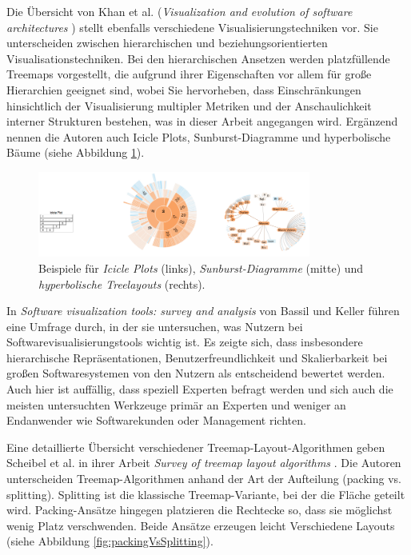 Die Übersicht von Khan et al. (\textit{Visualization and evolution of software architectures} \cite{visualizationEvolution}) stellt ebenfalls verschiedene Visualisierungstechniken vor.
Sie unterscheiden zwischen hierarchischen und beziehungsorientierten Visualisationstechniken. Bei den hierarchischen Ansetzen werden platzfüllende Treemaps vorgestellt, die aufgrund ihrer Eigenschaften vor allem für große Hierarchien geeignet sind, wobei Sie hervorheben, dass Einschränkungen hinsichtlich der Visualisierung multipler Metriken und der Anschaulichkeit interner Strukturen bestehen, was in dieser Arbeit angegangen wird. Ergänzend nennen die Autoren auch Icicle Plots, Sunburst-Diagramme und hyperbolische Bäume (siehe Abbildung \ref{fig:dreiVis}).

\begin{figure}
    \centering
    \includegraphics[width=0.8\textwidth]{images/verwandte/dreiVis.png}
    \caption{Beispiele für \textit{Icicle Plots} (links), \textit{Sunburst-Diagramme} (mitte) und \textit{hyperbolische Treelayouts} (rechts). \cite[4]{visualizationEvolution}}
    \label{fig:dreiVis}
\end{figure}

In \textit{Software visualization tools: survey and analysis} \cite{bassil2001software} von Bassil und Keller führen eine Umfrage durch, in der sie untersuchen, was Nutzern bei Softwarevisualisierungstools wichtig ist. Es zeigte sich, dass insbesondere hierarchische Repräsentationen, Benutzerfreundlichkeit und Skalierbarkeit bei großen Softwaresystemen von den Nutzern als entscheidend bewertet werden. Auch hier ist auffällig, dass speziell Experten befragt werden und sich auch die meisten untersuchten Werkzeuge primär an Experten und weniger an Endanwender wie Softwarekunden oder Management richten.

Eine detaillierte Übersicht verschiedener Treemap-Layout-Algorithmen geben Scheibel et al. in ihrer Arbeit \textit{Survey of treemap layout algorithms} \cite{scheibel2020survey}. Die Autoren unterscheiden Treemap-Algorithmen anhand der Art der Aufteilung (packing vs. splitting). Splitting ist die klassische Treemap-Variante, bei der die Fläche geteilt wird. Packing-Ansätze hingegen platzieren die Rechtecke so, dass sie möglichst wenig Platz verschwenden. Beide Ansätze erzeugen leicht Verschiedene Layouts (siehe Abbildung \ref{fig:packingVsSplitting}).  

